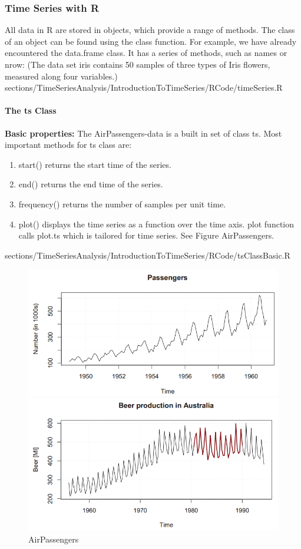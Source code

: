 \subsubsection{Time Series with \color{blue}R}
{
\RTheory
{	All data in {\color{blue}R} are stored in objects, which provide a range of methods. The class of an object can be found using the {\color{blue}class} function. For example, we have already encountered the {\color{blue}data.frame} class. It has a series of methods, such as {\color{blue}names} or {\color{blue}nrow}: \vfill
(The data set iris contains 50 samples of three types of Iris flowers, measured along four variables.)}
{sections/TimeSeriesAnalysis/IntroductionToTimeSeries/RCode/timeSeries.R}
\paragraph{The {\color{blue}ts} Class}
{\RTheory
{\textbf{Basic properties:}\vfill
	The AirPassengers-data is a built in set of class {\color{blue}ts}. Most important methods for {\color{blue}ts} class are:\vfill 
\begin{enumerate}
\item  {\color{blue}start()} returns the start time of the series.
\item  {\color{blue}end()} returns the end time of the series.
\item  {\color{blue}frequency()} returns the number of samples per unit time.
\item  {\color{blue}plot()} displays the time series as a function over the time axis. {\color{blue}plot} function calls {\color{blue}plot.ts} which is tailored for time series. See Figure AirPassengers. 
\end{enumerate}}
{sections/TimeSeriesAnalysis/IntroductionToTimeSeries/RCode/tsClassBasic.R}
\begin{figure}[H]\centering
	\includegraphics[width=0.7\linewidth]{images/tsAirPassengers.png}
	\caption{AirPassengers}
	\includegraphics[width=0.7\linewidth]{images/tsSeasBehav.png}

\end{figure}}}
